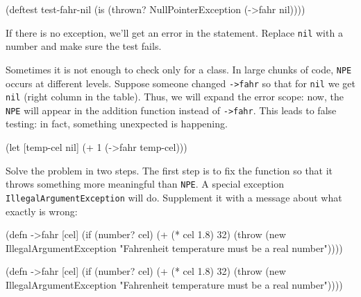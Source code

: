\begin{english}
  \begin{clojure}
(deftest test-fahr-nil
  (is (thrown? NullPointerException
               (->fahr nil))))
  \end{clojure}
\end{english}

If there is no exception, we'll get an error in the statement. Replace \verb|nil| with a number and make sure the test fails.


Sometimes it is not enough to check only for a class. In large chunks of code, \verb|NPE| occurs at different levels. Suppose someone changed \verb|->fahr| so that for \verb|nil| we get \verb|nil| (right column in the table). Thus, we will expand the error scope: now, the \verb|NPE| will appear in the addition function instead of \verb|->fahr|. This leads to false testing: in fact, something unexpected is happening.

\begin{english}
  \begin{clojure}
(let [temp-cel nil]
  (+ 1 (->fahr temp-cel)))
  \end{clojure}
\end{english}

\label{illegal-arg}

Solve the problem in two steps. The first step is to fix the function so that it throws something more meaningful than \verb|NPE|. A special exception \texttt{IllegalArgument\-Ex\-cep\-tion} will do. Supplement it with a message about what exactly is wrong:

\ifnarrow

\begin{english}
  \begin{clojure}
(defn ->fahr [cel]
  (if (number? cel)
    (+ (* cel 1.8) 32)
    (throw (new IllegalArgumentException
             "Fahrenheit temperature
              must be a real number"))))
  \end{clojure}
\end{english}

\else

\begin{english}
  \begin{clojure}
(defn ->fahr [cel]
  (if (number? cel)
    (+ (* cel 1.8) 32)
    (throw (new IllegalArgumentException
            "Fahrenheit temperature must be a real number"))))
  \end{clojure}
\end{english}

